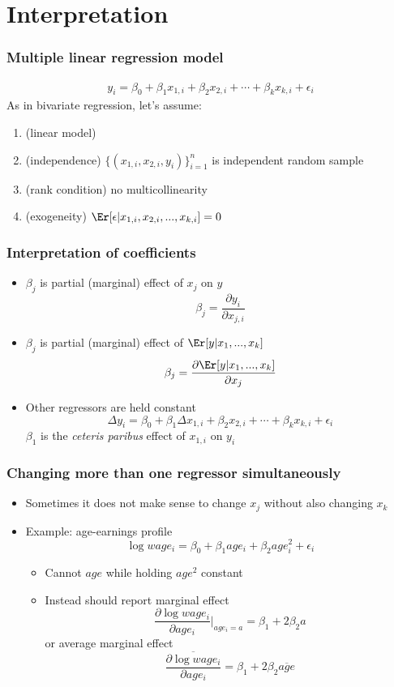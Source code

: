 \section{Interpretation}
\begin{frame}
  \frametitle{Multiple linear regression model}
  \begin{align*}
    y_i = \beta_0 + \beta_1 x_{1,i} + \beta_2 x_{2,i} + \cdots +
    \beta_k x_{k,i} + \epsilon_i 
  \end{align*}
  As in bivariate regression, let's assume:
  \begin{enumerate}
  \item[MLR.1] (linear model) 
  \item[MLR.2] (independence) $\{(x_{1,i},x_{2,i},y_i)\}_{i=1}^n$ is independent random
    sample
  \item[MLR.3] (rank condition) no multicollinearity 
  \item[MLR.4] (exogeneity) $\Er[\epsilon | x_{1,i}, x_{2,i}, ..., x_{k,i}] = 0$
  \end{enumerate}
\end{frame}

\begin{frame}
  \frametitle{Interpretation of coefficients}
  \begin{itemize}
  \item $\beta_j$ is partial (marginal) effect of $x_j$ on $y$
    \[ \beta_j = \frac{\partial y_i}{\partial x_{j,i}} \]
  \item  $\beta_j$ is partial (marginal) effect of 
    $\Er[y|x_1,...,x_k]$ 
    \[ \beta_j = \frac{\partial \Er[y|x_1,...,x_k] }{\partial x_j} \]
  \item Other regressors are held constant 
    \[ \Delta y_i = \beta_0 + \beta_1 \Delta x_{1,i} + \beta_2 x_{2,i} + \cdots +
    \beta_k x_{k,i} + \epsilon_i \]    
    $\beta_1$ is the {\slshape{ceteris paribus}} effect of $x_{1,i}$
    on $y_i$
  \end{itemize}
\end{frame}

\begin{frame}
  \frametitle{Changing more than one regressor simultaneously}
  \begin{itemize}
  \item Sometimes it does not make sense to change $x_j$ without also
    changing $x_k$
  \item Example: age-earnings profile
    \[ \log wage_i = \beta_0 + \beta_1 age_i + \beta_2 age_i^2 +
    \epsilon_i \]
    \begin{itemize}
    \item Cannot $age$ while holding $age^2$ constant
    \item Instead should report marginal effect
      \[ \frac{\partial \log wage_i}{\partial age_i}|_{age_i = a} = \beta_1 +
      2\beta_2 a \]
      or average marginal effect
      \[ \overline{\frac{\partial \log wage_i}{\partial age_i}} =
      \beta_1 + 2\beta_2 \overline{age} \]
    \end{itemize}
  \end{itemize}
\end{frame}

